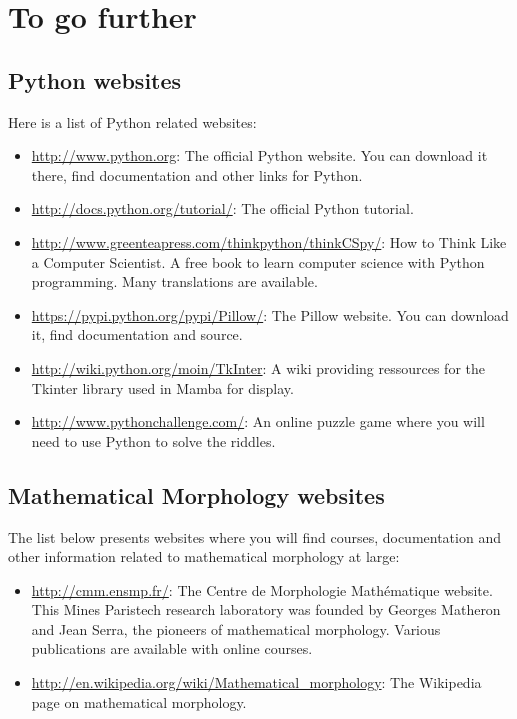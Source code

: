 \documentclass[a4paper,10pt,oneside]{article}
\begin{document}
\pagebreak

\appendix

\section{To go further}
\label{cha:to_go_further}
\subsection{Python websites}

Here is a list of Python related websites:

\begin{itemize}
\item \url{http://www.python.org}: The official Python website. You can download
it there, find documentation and other links for Python.
\item \url{http://docs.python.org/tutorial/}: The official Python tutorial.
\item \url{http://www.greenteapress.com/thinkpython/thinkCSpy/}: How to Think 
Like a Computer Scientist. A free book to learn computer science with Python
programming. Many translations are available.
\item \url{https://pypi.python.org/pypi/Pillow/}: The Pillow
website. You can download it, find documentation and source.
\item \url{http://wiki.python.org/moin/TkInter}: A wiki providing ressources
for the Tkinter library used in Mamba for display.
\item \url{http://www.pythonchallenge.com/}: An online puzzle game where you
will need to use Python to solve the riddles.
\end{itemize}

\subsection{Mathematical Morphology websites}

The list below presents websites where you will find courses, documentation and
other information related to mathematical morphology at large:

\begin{itemize}
\item \url{http://cmm.ensmp.fr/}: The Centre de Morphologie Math\'{e}matique
website. This Mines Paristech research laboratory was founded by Georges Matheron 
and Jean Serra, the pioneers of mathematical
morphology. Various publications are available with online courses.
\item \url{http://en.wikipedia.org/wiki/Mathematical_morphology}: The Wikipedia
page on mathematical morphology.
\end{itemize}
\end{document}
